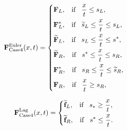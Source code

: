 \documentclass[review]{elsarticle}
\begin{document}
 \begin{equation}\label{eq:HLLCEP}
   \mathbf{F}^{\text{Euler}}_{\text{Case4}}(x,t) = \left\{ \begin{aligned}
        & \mathbf{F}_L, \hspace{0.3cm} \text{if} \hspace{0.3cm} \frac{x}{t}\le s_L, \\
        & \mathbf{F}_L^*, \hspace{0.3cm} \text{if} \hspace{0.3cm} \widetilde{s}_L\le \frac{x}{t} \le s_L, \\
        & \widetilde{\mathbf{F}}_L, \hspace{0.3cm} \text{if} \hspace{0.3cm} s_L\le \frac{x}{t} \le s^*, \\
        & \widetilde{\mathbf{F}}_R, \hspace{0.3cm} \text{if} \hspace{0.3cm} s^*\le \frac{x}{t} \le s_R, \\
        & \mathbf{F}_R^*, \hspace{0.3cm} \text{if} \hspace{0.3cm} s_R\le \frac{x}{t} \le\widetilde{ s}_R,\\
        & \mathbf{F}_R, \hspace{0.3cm} \text{if} \hspace{0.3cm} \frac{x}{t}\ge s_R, \\
      \end{aligned}
    \right.
  \end{equation}

\begin{equation}
\mathbf{F}^{\text{Lag}}_{\text{Case4}}(x,t) = \left\{ \begin{aligned}
        & \widetilde{\mathbf{f}}_L, \hspace{0.3cm} \text{if} \hspace{0.3cm} s_*\ge \frac{x}{t},\\
        & \widetilde{\mathbf{f}}_R, \hspace{0.3cm} \text{if} \hspace{0.3cm} s^*\le \frac{x}{t}.\\
      \end{aligned}
    \right.
  \end{equation}
\end{document}
